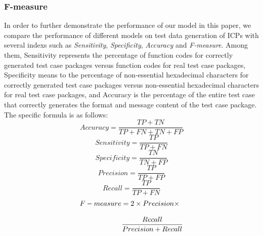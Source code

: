 \subsubsection{\textbf{F-measure}}
In order to further demonstrate the performance of our model in this paper, we compare the performance of different models on test data generation of ICPs with several indexs such as \textit{Sensitivity}, \textit{Specificity}, \textit{Accuracy} and \textit{F-measure}.  Among them, Sensitivity represents the percentage of function codes for correctly generated test case packages versus function codes for real test case packages, Specificity means to the percentage of non-essential hexadecimal characters for correctly generated test case packages versus non-essential hexadecimal characters for real test case packages, and Accuracy is the percentage of the entire test case that correctly generates the format and message content of the test case package. The specific formula is as follows:
\begin{equation}
Accuracy = \frac{{TP + TN}}{{TP + FN + TN + FP}}
\end{equation}
\begin{equation}
Sensitivity = \frac{{TP}}{{TP + FN}}
\end{equation}
\begin{equation}
Specificity = \frac{{TN}}{{TN + FP}}
\end{equation}
\begin{equation}
Precision = \frac{{TP}}{{TP + FP}}
\end{equation}
\begin{equation}
Recall = \frac{{TP}}{{TP + FN}}
\end{equation}
\begin{equation}
\begin{array}{l}
F - measure =\displaystyle{2 \times Precision \times}  \\
\\{\kern 1pt} {\kern 1pt} {\kern 1pt} {\kern 1pt} {\kern 1pt} {\kern 1pt} {\kern 1pt} {\kern 1pt} {\kern 1pt} {\kern 1pt} {\kern 1pt} {\kern 1pt} {\kern 1pt} {\kern 1pt} {\kern 1pt} {\kern 1pt} {\kern 1pt} {\kern 1pt} {\kern 1pt} {\kern 1pt} {\kern 1pt} {\kern 1pt} {\kern 1pt} {\kern 1pt} {\kern 1pt} {\kern 1pt} {\kern 1pt} {\kern 1pt} {\kern 1pt} {\kern 1pt} {\kern 1pt} {\kern 1pt} {\kern 1pt} {\kern 1pt} {\kern 1pt} {\kern 1pt} {\kern 1pt} {\kern 1pt} {\kern 1pt} {\kern 1pt} {\kern 1pt} {\kern 1pt} {\kern 1pt} {\kern 1pt} {\kern 1pt} {\kern 1pt} {\kern 1pt} {\kern 1pt} {\kern 1pt} {\kern 1pt} {\kern 1pt} {\kern 1pt} {\kern 1pt} {\kern 1pt} {\kern 1pt} {\kern 1pt} {\kern 1pt} {\kern 1pt} {\kern 1pt} \displaystyle\frac{{Recall}}{{Precision + Recall}}
\end{array}
\end{equation}
